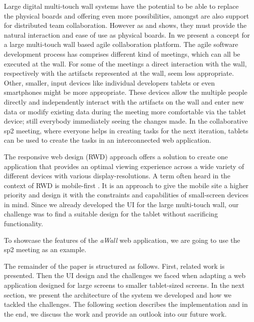 \documentclass{sigchi}
\begin{document}
Large digital multi-touch wall systems have the potential to be able to replace the physical boards and offering even more possibilities, amongst are also support for distributed team collaboration. However as \cite{udcw:31721} and \cite{Mateescu:2015} shows, they must provide the natural interaction and ease of use as physical boards. 
In \cite{Mateescu:2015} we present a concept for a large multi-touch wall based agile collaboration platform. The agile software development process has comprises different kind of meetings, which can all be executed at the wall. For some of the meetings a direct interaction with the wall, respectively with the artifacts represented at the wall, seem less appropriate. Other, smaller, input devices like individual developers tablets or even smartphones might be more appropriate. These devices allow the multiple people directly and independently interact with the artifacts on the wall and enter new data or modify existing data during the meeting more comfortable via the tablet device; still everybody immediately seeing the changes made. 
In the collaborative \gls{sp2} meeting, where everyone helps in creating tasks for the next iteration, tablets can be used to create the tasks in an interconnected web application.

The responsive web design (RWD) \cite{Marcotte:2011} approach offers a solution to create one application that provides an optimal viewing experience across a wide variety of different devices with various display-resolutions. 
A term often heard in the context of RWD is mobile-first \cite{Wroblewski:2011}. 
It is an approach to give the mobile site a higher priority and design it with the constraints and capabilities of small-screen devices in mind. 
Since we already developed the UI for the large multi-touch wall, our challenge was to find a suitable design for the tablet without sacrificing functionality.

To showcase the features of the \textit{aWall} web application, we are going to use the \gls{sp2} meeting as an example.

The remainder of the paper is structured as follows.
First, related work is presented.
Then the UI design and the challenges we faced when adapting a web application designed for large screens to smaller tablet-sized screens.
In the next section, we present the architecture of the system we developed and how we tackled the challenges.
The following section describes the implementation and in the end, we discuss the work and provide an outlook into our future work.
\end{document}
